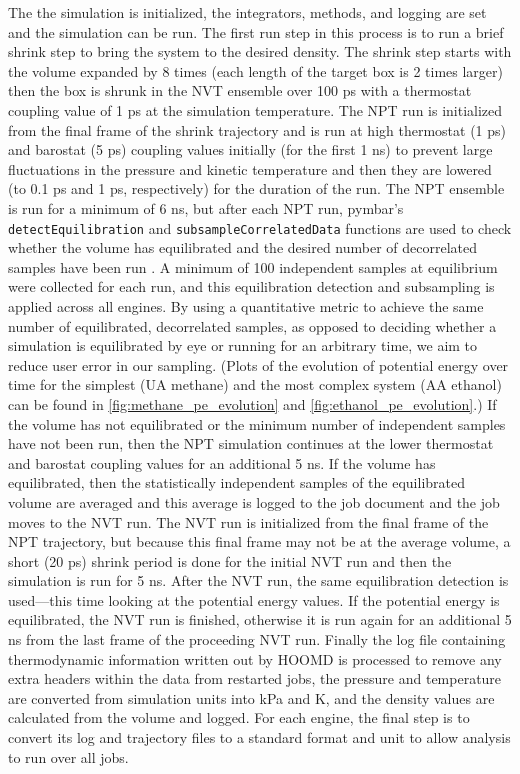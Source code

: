 The the simulation is initialized, the integrators, methods, and logging are set and the simulation can be run. 
The first run step in this process is to run a brief shrink step to bring the system to the desired density. 
The shrink step starts with the volume expanded by 8 times (each length of the target box is 2 times larger) then the box is shrunk in the NVT ensemble over 100 ps with a thermostat coupling value of 1 ps at the simulation temperature. 
The NPT run is initialized from the final frame of the shrink trajectory and is run at high thermostat (1 ps) and barostat (5 ps) coupling values initially (for the first 1 ns) to prevent large fluctuations in the pressure and kinetic temperature and then they are lowered (to 0.1 ps and 1 ps, respectively) for the duration of the run. %
The NPT ensemble is run for a minimum of 6 ns, but after each NPT run, pymbar's \lstinline{detectEquilibration} and \lstinline{subsampleCorrelatedData} functions are used to check whether the volume has equilibrated and the desired number of decorrelated samples have been run \cite{Chodera2007, Chodera2016, Shirts2008a}. 
A minimum of 100 independent samples at equilibrium were collected for each run, and this equilibration detection and subsampling is applied across all engines.
By using a quantitative metric to achieve the same number of equilibrated, decorrelated samples, as opposed to deciding whether a simulation is equilibrated by eye or running for an arbitrary time, we aim to reduce user error in our sampling.
(Plots of the evolution of potential energy over time for the simplest (UA methane) and the most complex system (AA ethanol) can be found in \autoref{fig:methane_pe_evolution} and \autoref{fig:ethanol_pe_evolution}.)
If the volume has not equilibrated or the minimum number of independent samples have not been run, then the NPT simulation continues at the lower thermostat and barostat coupling values for an additional 5 ns. 
If the volume has equilibrated, then the statistically independent samples of the equilibrated volume are averaged and this average is logged to the job document and the job moves to the NVT run. 
The NVT run is initialized from the final frame of the NPT trajectory, but because this final frame may not be at the average volume, a short (20 ps) shrink period is done for the initial NVT run and then the simulation is run for 5 ns. 
After the NVT run, the same equilibration detection is used---this time looking at the potential energy values. If the potential energy is equilibrated, the NVT run is finished, otherwise it is run again for an additional 5 ns from the last frame of the proceeding NVT run. 
Finally the log file containing thermodynamic information written out by HOOMD is processed to remove any extra headers within the data from restarted jobs, the pressure and temperature are converted from simulation units into kPa and K, and the density values are calculated from the volume and logged.
For each engine, the final step is to convert its log and trajectory files to a standard format and unit to allow analysis to run over all jobs.

